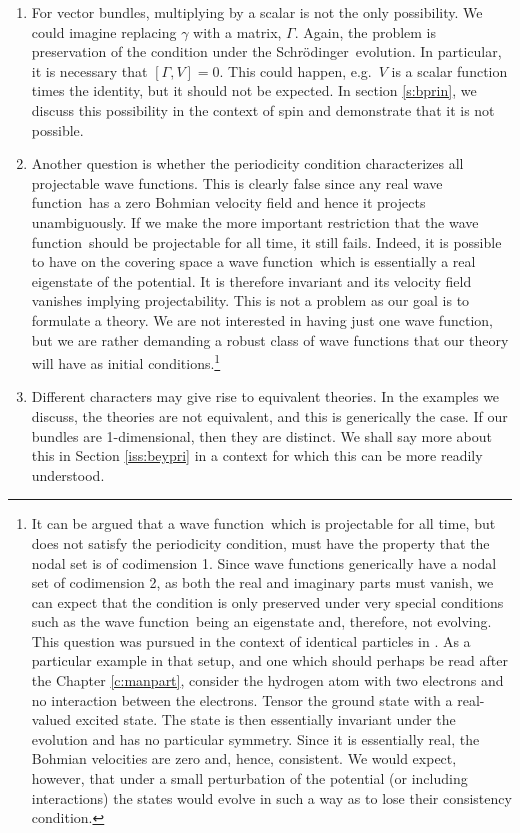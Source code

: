 \documentclass[11pt]{article}
\theoremstyle{remark}
\begin{document}
\begin{enumerate}
\item For vector bundles, multiplying by a scalar is not the only
possibility. We could imagine replacing $\gamma$ with a matrix,
$\Gamma$. Again, the problem is preservation of the condition under
the Schr\"odinger\ evolution. In particular, it is necessary that $[\Gamma, V]
= 0$. This could happen, e.g.\ $V$ is a scalar function times the
identity, but it should not be expected. 
 In section {\ref{s:bprin}}, we discuss
this possibility in the context of spin and demonstrate that it is not
possible. 

\item Another question is whether the periodicity condition
characterizes all projectable wave functions. This is clearly false since any
real wave function\ has a zero Bohmian velocity field and hence it projects
unambiguously. If we make the more important restriction that the wave function\
should be projectable for all time, it still fails. Indeed, it is
possible to have on the covering space a wave function\ which is essentially a real
eigenstate of the potential.
 It is therefore invariant and its
velocity field vanishes implying projectability. This is not a problem
as our goal is to formulate a theory. 
We are not interested in
having just one wave function, but we are rather demanding
 a robust class of wave functions that our
theory will have as initial conditions.\footnote{It can be argued  
 that a wave function\ which is projectable for all time, 
but does not satisfy the
periodicity condition, must have the property that the nodal set is
of codimension 1. Since wave functions generically have a nodal set of
codimension 2, as both the real and imaginary parts must vanish, we
can expect that the condition is only preserved under very special
conditions such as the wave function\ being an eigenstate and, therefore, not
evolving. This question was pursued in the context of identical
particles in \cite{Bac03}. As a particular example in that setup, and
one which should perhaps be read after the Chapter \ref{c:manpart},
consider 
 the hydrogen atom with two electrons and no interaction
between the electrons. Tensor the ground state with a real-valued excited
state. The state is then essentially invariant under the
evolution and has no particular symmetry. Since it is essentially
real, the Bohmian velocities are 
zero and, hence, consistent. We would expect, however, that under a
small perturbation of the potential (or including interactions) the
states would evolve in such a way as to lose their consistency
condition. 
} 

\item Different characters may give rise to equivalent theories. In the
examples we discuss, the theories are not equivalent, and this is
generically the case. 
If our bundles are 1-dimensional, then they are distinct. 
 We shall say more about this in Section {\ref{iss:beypri}} in a context for
which this can be more readily understood.

\end{enumerate}
\end{document}
